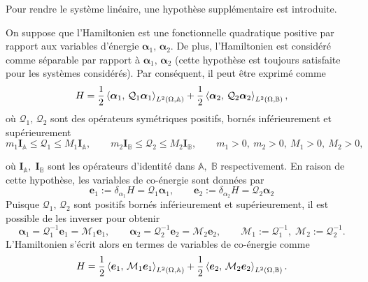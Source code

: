 Pour rendre le système linéaire, une hypothèse supplémentaire est introduite.
\begin{hypothese}\label{ass:quadHam_fr}
On suppose que l'Hamiltonien est une fonctionnelle quadratique positive par rapport aux variables d'énergie $\bm{\alpha}_1, \, \bm{\alpha}_2 $. De plus, l'Hamiltonien est considéré comme séparable par rapport à $\bm{\alpha}_1, \, \bm{\alpha}_2 $ (cette hypothèse est toujours satisfaite pour les systèmes considérés). Par conséquent, il peut être exprimé comme
\begin{equation*}
H = \frac{1}{2} \inner[L^2(\Omega, \mathbb{A})]{\bm{\alpha}_{1}}{\mathcal{Q}_1\bm{\alpha}_{1}} + \frac{1}{2} \inner[L^2(\Omega, \mathbb{B})]{\bm{\alpha}_{2}}{\mathcal{Q}_2\bm{\alpha}_{2}},
\end{equation*}
où $ \mathcal{Q}_1, \, \mathcal{Q}_2 $ sont des opérateurs symétriques positifs, bornés inférieurement et supérieurement
\begin{equation*}
m_1 \bm{I}_\mathbb{A} \le\mathcal{Q}_1 \le M_1 \bm{I}_\mathbb{A}, \qquad  m_2 \bm{I}_\mathbb{B} \le \mathcal{Q}_2 \le M_2 \bm{I}_\mathbb{B}, \qquad m_1>0, \ m_2>0, \ M_1>0, \ M_2>0,
\end{equation*} 
\end{hypothese}
où $\bm{I}_\mathbb{A}, \; \bm{I}_\mathbb{B}$ sont les opérateurs d'identité dans $\mathbb{A}, \; \mathbb{B}$ respectivement. En raison de cette hypothèse, les variables de co-énergie sont données par
\begin{equation*}
\bm{e}_1 := \delta_{\alpha_1} H = \mathcal{Q}_1 \bm{\alpha}_1, \qquad \bm{e}_2 := \delta_{\alpha_2} H = \mathcal{Q}_2 \bm{\alpha}_2
\end{equation*}
Puisque $\mathcal{Q}_1, \, \mathcal{Q}_2 $ sont positifs bornés inférieurement et supérieurement, il est possible de les inverser pour obtenir
\begin{equation*}
\bm{\alpha}_1 = \mathcal{Q}_1^{-1}\bm{e}_1 = \mathcal{M}_1\bm{e}_1, \qquad  \bm{\alpha}_2 = \mathcal{Q}_2^{-1} \bm{e}_2 = \mathcal{M}_2 \bm{e}_2, \qquad \mathcal{M}_1 := \mathcal{Q}_1^{-1}, \; \mathcal{M}_2 := \mathcal{Q}_2^{-1}.
\end{equation*}
L'Hamiltonien s'écrit alors en termes de variables de co-énergie comme
\begin{equation*}
H = \frac{1}{2} \inner[L^2(\Omega, \mathbb{A})]{\bm{e}_{1}}{\mathcal{M}_1\bm{e}_{1}} + \frac{1}{2} \inner[L^2(\Omega, \mathbb{B})]{\bm{e}_{2}}{\mathcal{M}_2\bm{e}_{2}}.
\end{equation*}

